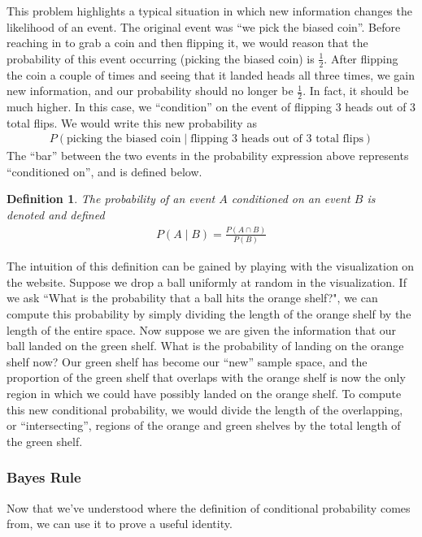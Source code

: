 \documentclass[11pt,letterpaper]{article}
\numberwithin{theorem}{section}
\newtheorem{definition}[theorem]{Definition}
\numberwithin{definition}{section}
\numberwithin{lemma}{section}
\numberwithin{corollary}{section}
\numberwithin{proposition}{section}
\theoremstyle{definition}
\numberwithin{remark}{section}
\numberwithin{claim}{section}
\numberwithin{observation}{section}
\numberwithin{fact}{section}
\numberwithin{assumption}{section}
\numberwithin{example}{section}
\numberwithin{exercise}{section}
\begin{document}
This problem highlights a typical situation in which new information changes the likelihood of an event. The original event was ``we pick the biased coin''. Before reaching in to grab a coin and then flipping it, we would reason that the probability of this event occurring (picking the biased coin) is $\frac{1}{2}$. After flipping the coin a couple of times and seeing that it landed heads all three times, we gain new information, and our probability should no longer be $\frac{1}{2}$. In fact, it should be much higher. In this case, we ``condition'' on the event of flipping 3 heads out of 3 total flips. We would write this new probability as
\begin{align*}
P(\text{picking the biased coin} \mid \text{flipping 3 heads out of 3 total flips})
\end{align*}
The ``bar'' between the two events in the probability expression above represents ``conditioned on'', and is defined below.
\begin{definition}
The probability of an event $A$ conditioned on an event $B$ is denoted and defined
\begin{align*}
P(A \mid B) = \frac{P(A \cap B)}{P(B)}
\end{align*}
\end{definition}
The intuition of this definition can be gained by playing with the visualization on the website. Suppose we drop a ball uniformly at random in the visualization. If we ask ``What is the probability that a ball hits the orange shelf?", we can compute this probability by simply dividing the length of the orange shelf by the length of the entire space. Now suppose we are given the information that our ball landed on the green shelf. What is the probability of landing on the orange shelf now? Our green shelf has become our ``new'' sample space, and the proportion of the green shelf that overlaps with the orange shelf is now the only region in which we could have possibly landed on the orange shelf. To compute this new conditional probability, we would divide the length of the overlapping, or ``intersecting'', regions of the orange and green shelves by the total length of the green shelf.

\subsubsection{Bayes Rule}
Now that we've understood where the definition of conditional probability comes from, we can use it to prove a useful identity.
\end{document}
